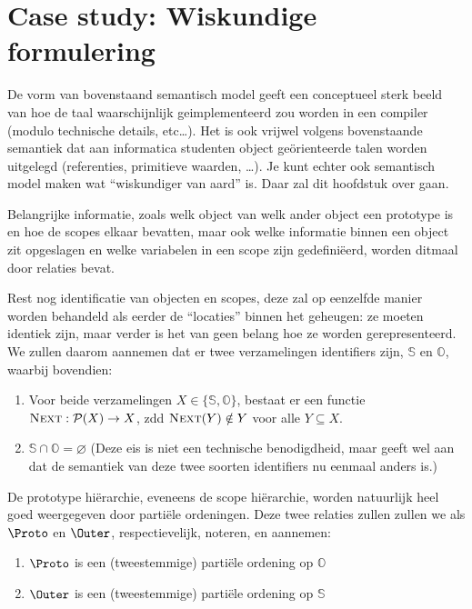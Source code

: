 
\chapter{Case study: Wiskundige formulering}

De vorm van bovenstaand semantisch model geeft een conceptueel sterk beeld van hoe de taal waarschijnlijk geimplementeerd zou worden in een compiler (modulo technische details, etc\dots). Het is ook vrijwel volgens bovenstaande semantiek dat aan informatica studenten object geörienteerde talen worden uitgelegd (referenties, primitieve waarden, \dots). Je kunt echter ook semantisch model maken wat “wiskundiger van aard” is. Daar zal dit hoofdstuk over gaan.

Belangrijke informatie, zoals welk object van welk ander object een prototype is en hoe de scopes elkaar bevatten, maar ook welke informatie binnen een object zit opgeslagen en welke variabelen in een scope zijn gedefiniëerd, worden ditmaal door relaties bevat.

Rest nog identificatie van objecten en scopes, deze zal op eenzelfde manier worden behandeld als eerder de “locaties” binnen het geheugen: ze moeten identiek zijn, maar verder is het van geen belang hoe ze worden gerepresenteerd. We zullen daarom aannemen dat er twee verzamelingen identifiers zijn, $\mathbb{S}$ en $\mathbb{O}$, waarbij bovendien:

\begin{enumerate}
	\item Voor beide verzamelingen $X \in \{\mathbb{S}, \mathbb{O}\}$, bestaat er een functie $\textsc{Next}:\mathcal{P}(X) \to X$, zdd $\textsc{Next}(Y) \notin Y$ voor alle $Y \subseteq X$.
	\item $\mathbb{S} \cap \mathbb{O} = \varnothing$ (Deze eis is niet een technische benodigdheid, maar geeft wel aan dat de semantiek van deze twee soorten identifiers nu eenmaal anders is.)
\end{enumerate}

De prototype hiërarchie, eveneens de scope hiërarchie, worden natuurlijk heel goed weergegeven door partiële ordeningen. Deze twee relaties zullen zullen we als $\Proto$ en $\Outer$, respectievelijk, noteren, en aannemen:

\begin{enumerate}
	\item $\Proto$ is een (tweestemmige) partiële ordening op $\mathbb{O}$
	\item $\Outer$ is een (tweestemmige) partiële ordening op $\mathbb{S}$
\end{enumerate}

